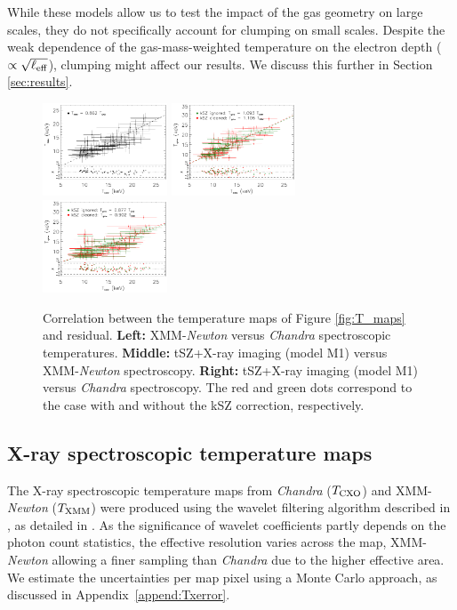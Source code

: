 \documentclass[twocolumn,traditabstract]{aa}
\newcommand{\ccor}[1]{\textcolor{Mypink}{#1}}
\begin{document}
\ccor{While these models allow us to test the impact of the gas geometry on large scales, they do not specifically account for clumping on small scales. Despite the weak dependence of the gas-mass-weighted temperature on the electron depth ($\propto \sqrt{\ell_{\rm eff}}$), clumping might affect our results. We discuss this further in Section \ref{sec:results}.}

\begin{figure}[h]
\centering
\includegraphics[width=0.33\textwidth]{Figure/Thermo_correlation_TXMM-TCXO.pdf}
\includegraphics[width=0.33\textwidth]{Figure/Thermo_correlation_TXMM-TSZ_leff1.pdf}
\includegraphics[width=0.33\textwidth]{Figure/Thermo_correlation_TCXO-TSZ_leff1.pdf}
\caption{\footnotesize{Correlation between the temperature maps of Figure \ref{fig:T_maps} and residual. {\bf Left:} XMM-\textit{Newton} versus \textit{Chandra} spectroscopic temperatures. {\bf Middle:} tSZ+X-ray imaging (model M1) versus XMM-\textit{Newton} spectroscopy. {\bf Right:} tSZ+X-ray imaging (model M1) versus \textit{Chandra} spectroscopy. The red and green dots correspond to the case with and without the kSZ correction, respectively.}}
\label{fig:T_SZ_T_X_correlation}
\end{figure}

\subsection{X-ray spectroscopic temperature maps}\label{sec:Xray_spectroscopic_temperature_map}
The X-ray spectroscopic temperature maps from \textit{Chandra} (${T}_{\rm CXO}$) and XMM-\textit{Newton} (${T}_{\rm XMM}$) were produced using the wavelet filtering algorithm described in \cite{Bourdin2008}, as detailed in \cite{Adam2016b}. As the significance of wavelet coefficients partly depends on the photon count statistics, the effective resolution varies across the map, XMM-\textit{Newton} allowing a finer sampling than \textit{Chandra} due to the higher effective area. \ccor{We estimate the uncertainties per map pixel using a Monte Carlo approach, as discussed in Appendix~\ref{append:Txerror}.}
\end{document}
